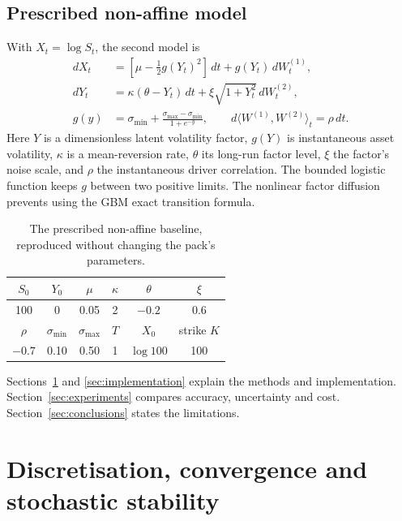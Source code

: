 \documentclass[11pt,a4paper]{article}
\begin{document}
\subsection{Prescribed non-affine model}\label{sec:nonaffine-model}
With $X_t=\log S_t$, the second model is
\begin{align}
dX_t&=[\mu-\tfrac12g(Y_t)^2]\,dt+g(Y_t)\,dW_t^{(1)},\label{eq:na-x}\\
dY_t&=\kappa(\theta-Y_t)\,dt+\xi\sqrt{1+Y_t^2}\,dW_t^{(2)},\label{eq:na-y}\\
g(y)&=\sigma_{\min}+\frac{\sigma_{\max}-\sigma_{\min}}{1+e^{-y}},\qquad
d\langle W^{(1)},W^{(2)}\rangle_t=\rho\,dt.\label{eq:na-g}
\end{align}
Here $Y$ is a dimensionless latent volatility factor, $g(Y)$ is instantaneous asset volatility, $\kappa$ is a mean-reversion rate, $\theta$ its long-run factor level, $\xi$ the factor's noise scale, and $\rho$ the instantaneous driver correlation. The bounded logistic function keeps $g$ between two positive limits. The nonlinear factor diffusion prevents using the GBM exact transition formula.
\begin{table}[H]\centering
\caption{The prescribed non-affine baseline, reproduced without changing the pack's parameters.}\label{tab:na-parameters}
\begin{tabular}{cccccc}\toprule
$S_0$ & $Y_0$ & $\mu$ & $\kappa$ & $\theta$ & $\xi$\\\midrule
100 & 0 & 0.05 & 2 & $-0.2$ & 0.6\\\midrule
$\rho$ & $\sigma_{\min}$ & $\sigma_{\max}$ & $T$ & $X_0$ & strike $K$\\\midrule
$-0.7$ & 0.10 & 0.50 & 1 & $\log100$ & 100\\\bottomrule
\end{tabular}
\end{table}
Sections~\ref{sec:methods} and \ref{sec:implementation} explain the methods and implementation. Section~\ref{sec:experiments} compares accuracy, uncertainty and cost. Section~\ref{sec:conclusions} states the limitations.
\newpage

\section{Discretisation, convergence and stochastic stability}\label{sec:methods}
\end{document}
